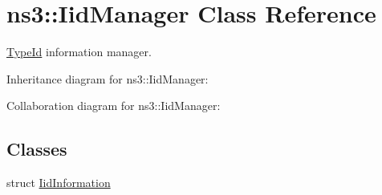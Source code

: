 \hypertarget{classns3_1_1IidManager}{}\section{ns3\+:\+:Iid\+Manager Class Reference}
\label{classns3_1_1IidManager}


\hyperlink{classns3_1_1TypeId}{Type\+Id} information manager.  




Inheritance diagram for ns3\+:\+:Iid\+Manager\+:


Collaboration diagram for ns3\+:\+:Iid\+Manager\+:
\subsection*{Classes}
\begin{DoxyCompactItemize}
\item 
struct \hyperlink{structns3_1_1IidManager_1_1IidInformation}{Iid\+Information}
\end{DoxyCompactItemize}
